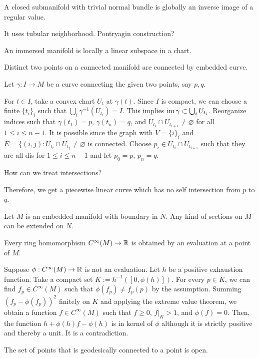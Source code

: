 \documentclass[a4paper]{article}
\begin{document}
\begin{prop}
A closed submanifold with trivial normal bundle is globally an inverse image of a regular value.
\end{prop}
\begin{pf}
It uses tubular neighborhood.
Pontryagin construction?
\end{pf}

\begin{prop}
An immersed manifold is locally a linear subspace in a chart.
\end{prop}

\begin{prop}
Distinct two points on a connected manifold are connected by embedded curve.
\end{prop}
\begin{pf}
Let $\gamma:I\to M$ be a curve connecting the given two points, say $p,q$.

For $t\in I$, take a convex chart $U_t$ at $\gamma(t)$.
Since $I$ is compact, we can choose a finite $\{t_i\}_i$ such that $\bigcup_i\gamma^{-1}(U_{t_i})=I$.
This implies $\operatorname{im}\gamma\subset\bigcup_iU_{t_i}$.
Reorganize indices such that $\gamma(t_1)=p$, $\gamma(t_n)=q$, and $U_{t_i}\cap U_{t_{i+1}}\ne\varnothing$ for all $1\le i\le n-1$.
It is possible since the graph with $V=\{i\}_i$ and $E=\{(i,j):U_{t_i}\cap U_{t_j}\ne\varnothing$ is connected.
Choose $p_i\in U_{t_i}\cap U_{t_{i+1}}$ such that they are all dis for $1\le i\le n-1$ and let $p_0=p$, $p_n=q$.

How can we treat intersections?

Therefore, we get a piecewise linear curve which has no self intersection from $p$ to $q$.

\end{pf}

\begin{prop}
Let $M$ is an embedded manifold with boundary in $N$.
Any kind of sections on $M$ can be extended on $N$.
\end{prop}

\begin{prop}
Every ring homomorphism $C^\infty(M)\to\mathbb{R}$ is obtained by an evaluation at a point of $M$.
\end{prop}
\begin{pf}
Suppose $\phi:C^\infty(M)\to\mathbb{R}$ is not an evaluation.
Let $h$ be a positive exhaustion function.
Take a compact set $K:=h^{-1}([0,\phi(h)])$.
For every $p\in K$, we can find $f_p\in C^\infty(M)$ such that $\phi(f_p)\ne f_p(p)$ by the assumption.
Summing $(f_p-\phi(f_p))^2$ finitely on $K$ and applying the extreme value theorem, we obtain a function $f\in C^\infty(M)$ such that $f\ge0$, $f|_K>1$, and $\phi(f)=0$.
Then, the function $h+\phi(h)f-\phi(h)$ is in kernel of $\phi$ although it is strictly positive and thereby a unit.
It is a contradiction.
\end{pf}


\begin{prop}
The set of points that is geodesically connected to a point is open.
\end{prop}
\end{document}
